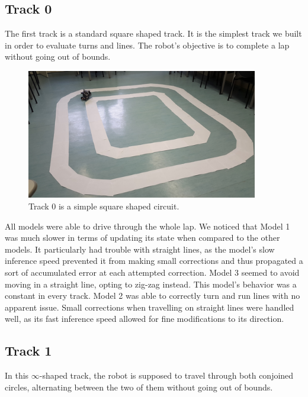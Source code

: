 \subsection{Track 0}

The first track is a standard square shaped track. It is the simplest track we built in order to
evaluate turns and lines. The robot's objective is to complete a lap without going out of bounds.

\begin{figure}[h]
  \centering\includegraphics[width=0.9\textwidth]{imgs/track_0.png}
  \caption{Track 0 is a simple square shaped circuit.}
\end{figure}

All models were able to drive through the whole lap. We noticed that Model 1 was much slower in
terms of updating its state when compared to the other models. It particularly had trouble with
straight lines, as the model's slow inference speed prevented it from making small corrections and
thus propagated a sort of accumulated error at each attempted correction. Model 3 seemed to avoid
moving in a straight line, opting to zig-zag instead. This model's behavior was a constant in every
track. Model 2 was able to correctly turn and run lines with no apparent issue. Small corrections
when travelling on straight lines were handled well, as its fast inference speed allowed for fine
modifications to its direction.

\subsection{Track 1}

In this $\infty$-shaped track, the robot is supposed to travel through both conjoined circles,
alternating between the two of them without going out of bounds.

